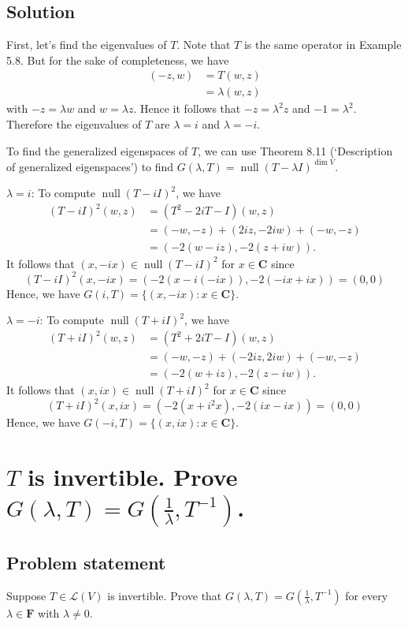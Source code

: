 \documentclass{article}
\begin{document}
\subsection*{Solution}
First, let's find the eigenvalues of $T$. 
Note that $T$ is the same operator in Example 5.8. 
But for the sake of completeness, we have
\begin{align*}
    (-z,w)&=T(w,z)\\
    &=\lambda (w,z)
\end{align*}
with $-z=\lambda w$ and $w=\lambda z$. 
Hence it follows that $-z=\lambda^2z$ and $-1=\lambda^2$. 
Therefore the eigenvalues of $T$ are $\lambda=i$ and $\lambda=-i$.

To find the generalized eigenspaces of $T$, we can use Theorem 8.11 (`Description of generalized eigenspaces') to find $G(\lambda,T)=\operatorname{null}(T-\lambda I)^{\operatorname{dim}V}$.

$\lambda=i$: To compute $\operatorname{null}(T-i I)^{2}$, we have
\begin{align*}
    (T-i I)^{2}(w,z)&=(T^2-2iT-I)(w,z)\\
    &=(-w,-z)+(2iz,-2iw)+(-w,-z)\\
    &=(-2(w-iz),-2(z+iw)).
\end{align*}
It follows that $(x,-ix)\in\operatorname{null}(T-i I)^{2}$ for $x\in\mathbf{C}$ since 
\[(T-i I)^{2}(x,-ix)=(-2(x-i(-ix)),-2(-ix+ix))=(0,0)\]
Hence, we have $G(i,T)=\{(x,-ix):x\in\mathbf{C}\}$.

$\lambda=-i$: To compute $\operatorname{null}(T+i I)^{2}$, we have
\begin{align*}
    (T+i I)^{2}(w,z)&=(T^2+2iT-I)(w,z)\\
    &=(-w,-z)+(-2iz,2iw)+(-w,-z)\\
    &=(-2(w+iz),-2(z-iw)).
\end{align*}
It follows that $(x,ix)\in\operatorname{null}(T+i I)^{2}$ for $x\in\mathbf{C}$ since 
\[(T+i I)^{2}(x,ix)=(-2(x+i^2x),-2(ix-ix))=(0,0)\]
Hence, we have $G(-i,T)=\{(x,ix):x\in\mathbf{C}\}$.

\clearpage

\section{$T$ is invertible. Prove $G(\lambda,T)=G(\frac{1}{\lambda},T^{-1})$.}
\subsection*{Problem statement}
Suppose $T\in\mathcal{L}(V)$ is invertible. 
Prove that $G(\lambda,T)=G(\frac{1}{\lambda},T^{-1})$ for every $\lambda\in\mathbf{F}$ with $\lambda\neq 0$.
\end{document}

